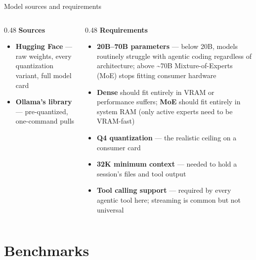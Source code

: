 \documentclass[aspectratio=169,10pt]{beamer}
\begin{document}
\begin{frame}{Model sources and requirements}
  \begin{columns}[T]
    \begin{column}{0.48\textwidth}
      \centering\textbf{Sources}\par\vspace{0.4em}
      \begin{itemize}
        \small
        \item \textbf{Hugging Face} --- raw weights, every quantization
          variant, full model card
        \item \textbf{Ollama's library} --- pre-quantized, one-command pulls
      \end{itemize}
    \end{column}
    \begin{column}{0.48\textwidth}
      \centering\textbf{Requirements}\par\vspace{0.4em}
      \begin{itemize}
        \footnotesize
        \item \textbf{\textcolor{accent}{20B--70B parameters}} --- below
          20B, models routinely struggle with agentic coding regardless of
          architecture; above \textasciitilde{}70B Mixture-of-Experts
          (MoE) stops fitting consumer hardware
        \item \textbf{Dense} should fit entirely in VRAM or performance
          suffers; \textbf{MoE} should fit entirely in system RAM (only
          active experts need to be VRAM-fast)
        \item \textbf{Q4 quantization} --- the realistic ceiling on a
          consumer card
        \item \textbf{32K minimum context} --- needed to hold a session's
          files and tool output
        \item \textbf{Tool calling support} --- required by every agentic
          tool here; streaming is common but not universal
      \end{itemize}
    \end{column}
  \end{columns}
\end{frame}

\section{Benchmarks}
\end{document}
